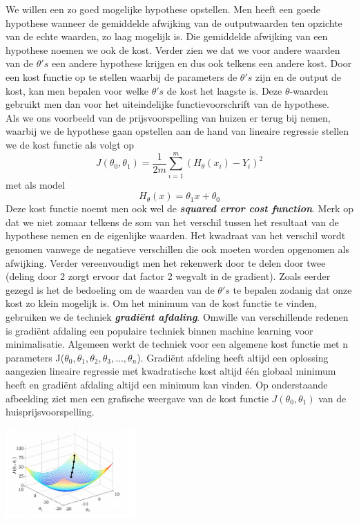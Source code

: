 We willen een zo goed mogelijke hypothese opstellen. Men heeft een goede hypothese wanneer de gemiddelde afwijking van de outputwaarden ten opzichte van de echte waarden, zo laag mogelijk is. Die gemiddelde afwijking van een hypothese noemen we ook de kost. Verder zien we dat we voor andere waarden van de $\theta's$ een andere hypothese krijgen en dus ook telkens een andere kost. Door een kost functie op te stellen waarbij de parameters de $\theta's$ zijn en de output de kost, kan men bepalen voor welke $\theta's$ de kost het laagste is. Deze $\theta$-waarden gebruikt men dan voor het uiteindelijke functievoorschrift van de hypothese. \\
Als we ons voorbeeld van de prijsvoorspelling van huizen er terug bij nemen, waarbij we de hypothese gaan opstellen aan de hand van lineaire regressie stellen we de kost functie als volgt op\\
\[J(\theta_{0},\theta_{1}) = \frac{1}{2m}\sum_{i=1}^{m} (H_{\theta}(x_i) - Y_i )^2\]
met als model 
\[H_{\theta}(x) = \theta_{1}x + \theta_{0}\]
%
Deze kost functie noemt men ook wel de \textbf{\textit{squared error cost function}}. Merk op dat we niet zomaar telkens de som van het verschil tussen het resultaat van de hypothese nemen en de eigenlijke waarden. Het kwadraat van het verschil wordt genomen vanwege de negatieve verschillen die ook moeten worden opgenomen als afwijking. Verder vereenvoudigt men het rekenwerk door te delen door twee (deling door 2 zorgt ervoor dat factor 2 wegvalt in de gradient). 
\newline
Zoals eerder gezegd is het de bedoeling om de waarden van de $\theta's$ te bepalen zodanig dat onze kost zo klein mogelijk is. Om het minimum van de kost functie te vinden, gebruiken we de techniek \textbf{\textit{gradi\"ent afdaling}}. Omwille van verschillende redenen is gradi\"ent afdaling een populaire techniek binnen machine learning voor minimalisatie. Algemeen werkt de techniek voor een algemene kost functie met n parameters J($\theta_{0},\theta_{1},\theta_{2},\theta_{3}, ... ,\theta_{n}$). Gradi\"ent afdeling heeft altijd een oplossing aangezien lineaire regressie met kwadratische kost altijd \'e\'en globaal minimum heeft en gradi\"ent afdaling altijd een minimum kan vinden.
Op onderstaande afbeelding ziet men een grafische weergave van de kost functie $J(\theta_{0},\theta_{1})$ van de huisprijsvoorspelling.
\newline
\begin{center}
  \includegraphics[width=5cm]{3d_plot_1}
\end{center}
